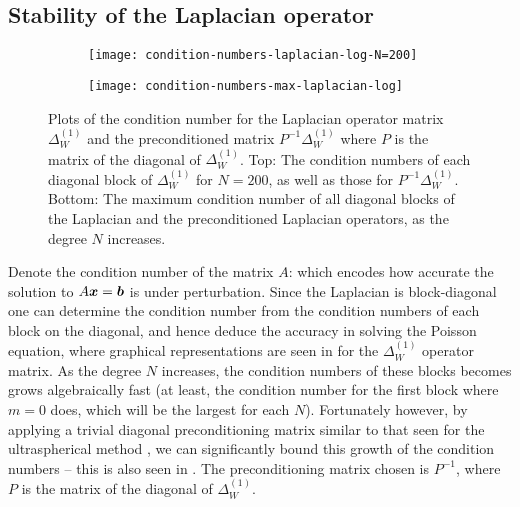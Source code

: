 \subsection{Stability of the Laplacian operator}

\begin{figure}[tp]
	\centering
	\begin{subfigure}[b]{0.55\textwidth}
		\centerline{\texttt{[image: condition-numbers-laplacian-log-N=200]}}
	\end{subfigure}
	\hfill%
	
	\begin{subfigure}[b]{0.55\textwidth}
		\centerline{\texttt{[image: condition-numbers-max-laplacian-log]}}
	\end{subfigure}
	\hfill%
	\caption{Plots of the condition number for the Laplacian operator matrix $\Delta^{(1)}_W$ and the preconditioned matrix $P^{-1} \Delta^{(1)}_W$ where $P$ is the matrix of the diagonal of $\Delta^{(1)}_W$. Top: The condition numbers of each diagonal block of $\Delta^{(1)}_W$ for $N = 200$, as well as those for $P^{-1} \Delta^{(1)}_W$. Bottom: The maximum condition number of all diagonal blocks of the Laplacian and the preconditioned Laplacian operators, as the degree $N$ increases.}
	\label{fig:sc:conditionnumbers}
\end{figure}

Denote the condition number of the matrix $A$: 
which encodes how accurate the solution to $A \mbox{\boldmath$x$\unboldmath} = \mbox{\boldmath$b$\unboldmath}$ is under perturbation. Since the Laplacian is block-diagonal one can determine the condition number from the condition numbers of each block on the diagonal,  and hence deduce the accuracy in solving the Poisson equation, where graphical representations are seen in  for the $\Delta^{(1)}_W$ operator matrix. As the degree $N$ increases, the condition numbers of these blocks becomes grows  algebraically fast (at least, the condition number for the first block where $m=0$ does, which will be the largest for each $N$). Fortunately however, by applying a trivial diagonal preconditioning matrix similar to that seen for the ultraspherical method \cite{olver2013fast}, we can significantly bound this growth of the condition numbers -- this is also seen in . The preconditioning matrix chosen is $P^{-1}$, where $P$ is the matrix of the diagonal of $\Delta^{(1)}_W$. 



